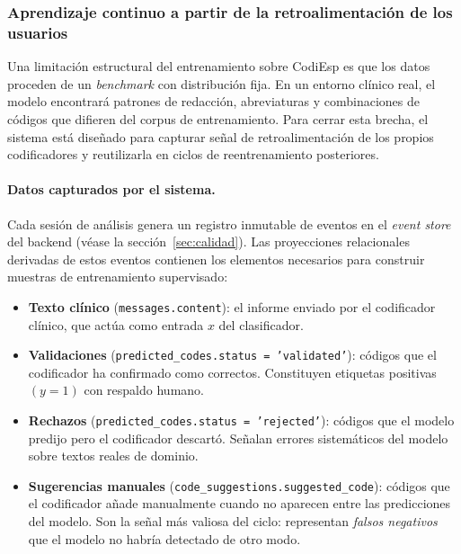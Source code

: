 \subsubsection{Aprendizaje continuo a partir de la retroalimentación de los usuarios}
\label{sec:continuous-learning}

Una limitación estructural del entrenamiento sobre CodiEsp es que los datos proceden de
un \emph{benchmark} con distribución fija. En un entorno clínico real, el modelo encontrará
patrones de redacción, abreviaturas y combinaciones de códigos que difieren del corpus de
entrenamiento. Para cerrar esta brecha, el sistema está diseñado para capturar señal de
retroalimentación de los propios codificadores y reutilizarla en ciclos de reentrenamiento
posteriores.

\paragraph{Datos capturados por el sistema.}
Cada sesión de análisis genera un registro inmutable de eventos en el \emph{event store}
del backend (véase la sección~\ref{sec:calidad}). Las proyecciones relacionales derivadas
de estos eventos contienen los elementos necesarios para construir muestras de
entrenamiento supervisado:

\begin{itemize}
 \item \textbf{Texto clínico} (\texttt{messages.content}): el informe enviado por el
 codificador clínico, que actúa como entrada $x$ del clasificador.
 \item \textbf{Validaciones} (\texttt{predicted\_codes.status = 'validated'}): códigos
 que el codificador ha confirmado como correctos. Constituyen etiquetas positivas
 $(y = 1)$ con respaldo humano.
 \item \textbf{Rechazos} (\texttt{predicted\_codes.status = 'rejected'}): códigos que el
 modelo predijo pero el codificador descartó. Señalan errores sistemáticos del modelo
 sobre textos reales de dominio.
 \item \textbf{Sugerencias manuales} (\texttt{code\_suggestions.suggested\_code}): códigos
 que el codificador añade manualmente cuando no aparecen entre las predicciones del
 modelo. Son la señal más valiosa del ciclo: representan \emph{falsos negativos} que el
 modelo no habría detectado de otro modo.
\end{itemize}

